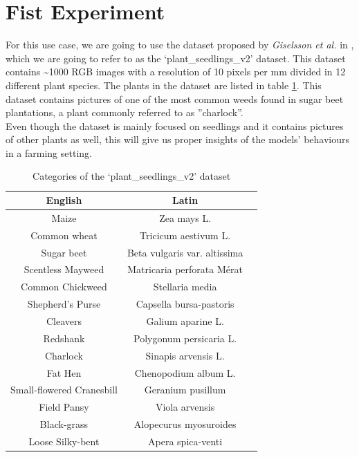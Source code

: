 \section{Fist Experiment}
For this use case, we are going to use the dataset proposed by \textit{Giselsson et al.} in \cite{giselsson2017public}, which we are going to refer to as the ‘plant\_seedlings\_v2’ dataset. This dataset contains \textasciitilde 1000 RGB images with a resolution of 10 pixels per mm divided in 12 different plant species. The plants in the dataset are listed in table \ref{tab:dataset_species}. This dataset contains pictures of one of the most common weeds found in sugar beet plantations, a plant commonly referred to as ''charlock''. \cite{cioni_weed_2010}\\
Even though the dataset is mainly focused on seedlings and it contains pictures of other plants as well, this will give us proper insights of the models' behaviours in a farming setting. 
\begin{table}[ht]
\centering
\begin{tabular}{|c|c|c|}
\hline
    English & Latin \\
\hline
    Maize & Zea mays L.\\
    Common wheat & Tricicum aestivum L.\\
    Sugar beet & Beta vulgaris var. altissima\\
    Scentless Mayweed & Matricaria perforata Mérat\\
    Common Chickweed & Stellaria media\\
    Shepherd’s Purse & Capsella bursa-pastoris\\
    Cleavers& Galium aparine L.\\
    Redshank& Polygonum persicaria L.\\
    Charlock& Sinapis arvensis L.\\
    Fat Hen& Chenopodium album L.\\
    Small-flowered Cranesbill & Geranium pusillum\\
    Field Pansy& Viola arvensis\\
    Black-grass& Alopecurus myosuroides\\
    Loose Silky-bent& Apera spica-venti\\
    \hline
\end{tabular}
\caption[Categories of the ‘plant\_seedlings\_v2’ dataset]{Categories of the ‘plant\_seedlings\_v2’ dataset \cite{giselsson2017public} }
\label{tab:dataset_species}
\end{table}

